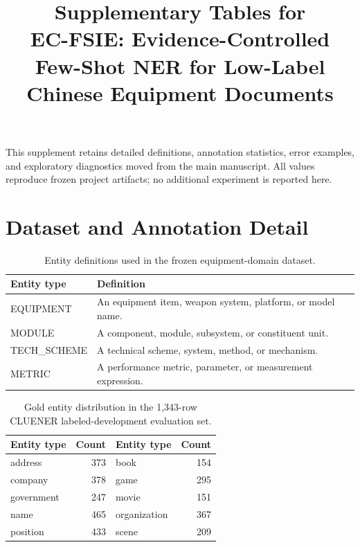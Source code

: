\documentclass[10pt,a4paper]{article}
\title{Supplementary Tables for\\
EC-FSIE: Evidence-Controlled Few-Shot NER for Low-Label Chinese Equipment
Documents}
\author{}
\date{}
\begin{document}
\maketitle

This supplement retains detailed definitions, annotation statistics, error
examples, and exploratory diagnostics moved from the main manuscript. All
values reproduce frozen project artifacts; no additional experiment is
reported here.

\section*{Dataset and Annotation Detail}

\begin{table}[ht]
\caption{Entity definitions used in the frozen equipment-domain dataset.}
\label{tab:s-entity-types}
\centering
\begin{tabular}{>{\ttfamily}p{3.0cm}p{10.5cm}}
\toprule
\normalfont Entity type & Definition \\
\midrule
EQUIPMENT & An equipment item, weapon system, platform, or model name. \\
MODULE & A component, module, subsystem, or constituent unit. \\
TECH\_SCHEME & A technical scheme, system, method, or mechanism. \\
METRIC & A performance metric, parameter, or measurement expression. \\
\bottomrule
\end{tabular}
\end{table}

\begin{table}[ht]
\caption{Gold entity distribution in the 1,343-row CLUENER labeled-development
evaluation set.}
\label{tab:s-cluener-types}
\centering
\begin{tabular}{lrlr}
\toprule
Entity type & Count & Entity type & Count \\
\midrule
address & 373 & book & 154 \\
company & 378 & game & 295 \\
government & 247 & movie & 151 \\
name & 465 & organization & 367 \\
position & 433 & scene & 209 \\
\bottomrule
\end{tabular}
\end{table}
\end{document}
